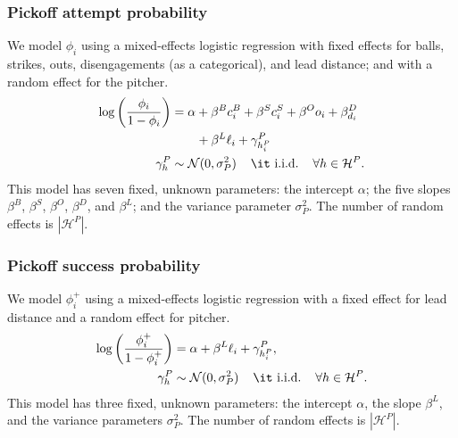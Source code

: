 \documentclass[opre,dblanonrev]{informs4}
\begin{document}
      \subsubsection{Pickoff attempt probability}
      \label{sec:prob-po-attempt}

        We model $\phi_i$ using a mixed-effects logistic regression with fixed effects for balls, strikes, outs, disengagements (as a categorical), and lead distance; and with a random effect for the pitcher.
        \begin{align}
          \label{eqn:prob-po-attempt}
          \begin{split}
            \log\left(\frac{\phi_i}{1 - \phi_i}\right) &= \alpha + \beta^B c_i^B + \beta^S c_i^S + \beta^O o_i + \beta^D_{d_i}\\
            & \qquad + \beta^L \ell_i + \gamma^P_{h_i^P}\\
            \gamma^P_{h} &\sim \mathcal{N}(0, \sigma^2_P) \hspace{4mm} \mbox{\it i.i.d.} \hspace{4mm} \forall h \in \mathcal{H}^P.
          \end{split}
        \end{align}
        This model has seven fixed, unknown parameters: the intercept $\alpha$; the five slopes $\beta^B$, $\beta^S$, $\beta^O$, $\beta^D$, and $\beta^L$; and the variance parameter $\sigma^2_P$. The number of random effects is $|\mathcal{H}^P|$.
        
      \subsubsection{Pickoff success probability}
      \label{sec:prob-po-success}

        We model $\phi_i^+$ using a mixed-effects logistic regression with a fixed effect for lead distance and a random effect for pitcher.
        \begin{align}
          \label{eqn:prob-po-success}
          \begin{split}
            \log\left(\frac{\phi_i^+}{1 - \phi_i^+}\right) &= \alpha + \beta^L \ell_i + \gamma^P_{h_i^P},\\
            \gamma^P_{h} &\sim \mathcal{N}(0, \sigma^2_P) \hspace{4mm} \mbox{\it i.i.d.} \hspace{4mm} \forall h \in \mathcal{H}^P.
          \end{split}
        \end{align}
        This model has three fixed, unknown parameters: the intercept $\alpha$, the slope $\beta^L$, and the variance parameters $\sigma^2_P$. The number of random effects is $|\mathcal{H}^P|$.
\end{document}

